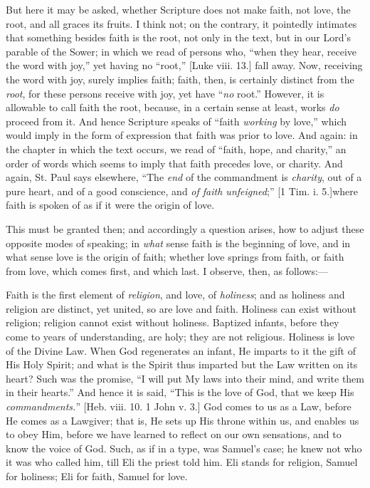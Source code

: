 But here it may be asked, whether Scripture does not make faith,
not love, the root, and all graces its fruits. I think not; on the
contrary, it pointedly intimates that something besides faith is the
root, not only in the text, but in our Lord's parable of the Sower;
in which we read of persons who, ``when they hear, receive the
word with joy,'' yet having no ``root,'' [Luke viii. 13.]
fall away. Now, receiving the word with joy, surely implies faith;
faith, then, is certainly distinct from the \emph{root}, for these
persons receive with joy, yet have ``\emph{no} root.''
However, it is allowable to call faith the root, because, in a certain
sense at least, works \emph{do} proceed from it. And hence Scripture
speaks of ``faith \emph{working} by love,'' which would imply
in the form of expression that faith was prior to love. And again: in
the chapter in which the text occurs, we read of ``faith, hope,
and charity,'' an order of words which seems to imply that faith
precedes love, or charity. And again, St. Paul says elsewhere,
``The \emph{end} of the commandment is \emph{charity}, out of a
pure heart, and of a good conscience, and \emph{of faith unfeigned};''
[1 Tim. i. 5.]\emph{}where faith is spoken of as if it were the
origin of love.

This must be granted then; and accordingly a question arises, how
to adjust these opposite modes of speaking; in \emph{what} sense faith
is the beginning of love, and in what sense love is the origin of
faith; whether love springs from faith, or faith from love, which
comes first, and which last. I observe, then, as follows:—

Faith is the first element of \emph{religion}, and love, of \emph{holiness};
and as holiness and religion are distinct, yet united, so are love and
faith. Holiness can exist without religion; religion cannot exist
without holiness. Baptized infants, before they come to years of
understanding, are holy; they are not religious. Holiness is love of
the Divine Law. When God regenerates an infant, He imparts to it the
gift of His Holy Spirit; and what is the Spirit thus imparted but the
Law written on its heart? Such was the promise, ``I will put My
laws into their mind, and write them in their hearts.'' And hence
it is said, ``This is the love of God, that we keep His \emph{commandments.}''
[Heb. viii. 10. 1 John v. 3.] God comes to us as a Law, before He
comes as a Lawgiver; that is, He sets up His throne within us, and
enables us to obey Him, before we have learned to reflect on our own
sensations, and to know the voice of God. Such, as if in a type, was
Samuel's case; he knew not who it was who called him, till Eli the
priest told him. Eli stands for religion, Samuel for holiness; Eli for
faith, Samuel for love.

